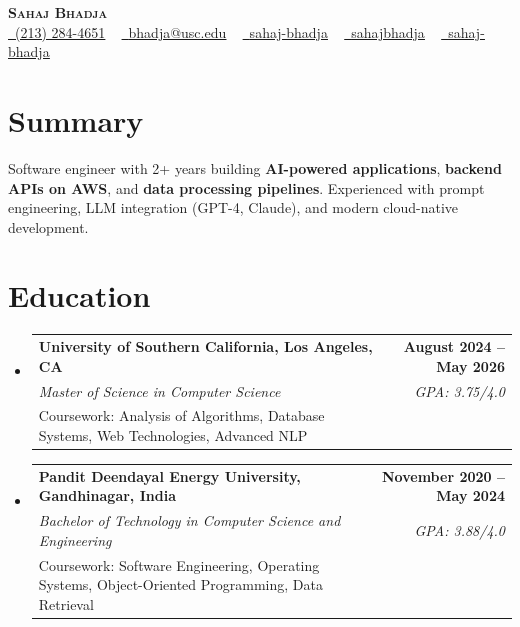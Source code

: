 \documentclass[letterpaper,10pt]{article}
\makeatletter
\newcommand{\resumeEduSubheading}[5]{\vspace{-1pt}\item\begin{tabular*}{1.0\textwidth}[t]{l@{\extracolsep{\fill}}r}\textbf{#1} & \textbf{\small #2} \\\textit{\small #3} & \textit{\small #4} \\\small #5 & \\\end{tabular*}\vspace{-4pt}}
\newcommand{\resumeSubHeadingListStart}{\begin{itemize}[leftmargin=0.0in, label={}]}
\newcommand{\resumeSubHeadingListEnd}{\end{itemize}}
\makeatother
\begin{document}
\begin{center}
{\Huge \scshape \textbf{Sahaj Bhadja}} \\ \vspace{1pt}
\small \href{tel:(213) 284-4651}{\faPhone\ \underline{(213) 284-4651}} ~ \href{mailto:bhadja@usc.edu}{\raisebox{-0.2\height}\faEnvelope\ \underline{bhadja@usc.edu}} ~
\href{https://www.linkedin.com/in/sahaj-bhadja/}{\raisebox{-0.2\height}\faLinkedin\ \underline{sahaj-bhadja}} ~ \href{https://github.com/SAHAJ-BHADJA}{\raisebox{-0.2\height}\faGithub\ \underline{sahajbhadja}} ~
\href{https://sahaj-bhadja.vercel.app/}{\raisebox{-0.2\height}\faGlobe\ \underline{sahaj-bhadja}}
\end{center}
\vspace{-18pt}
\section{Summary}
\begin{itemize}[leftmargin=0.15in, label={}]
\small{\item{Software engineer with 2+ years building \textbf{AI-powered applications}, \textbf{backend APIs on AWS}, and \textbf{data processing pipelines}. Experienced with prompt engineering, LLM integration (GPT-4, Claude), and modern cloud-native development.}}
\end{itemize}
\vspace{-16pt}
\section{Education}
\resumeSubHeadingListStart
\resumeEduSubheading{University of Southern California, Los Angeles, CA}{August 2024 -- May 2026}{Master of Science in Computer Science}{GPA: 3.75/4.0}{Coursework: Analysis of Algorithms, Database Systems, Web Technologies, Advanced NLP}
\vspace{-9pt}
\resumeEduSubheading{Pandit Deendayal Energy University, Gandhinagar, India}{November 2020 -- May 2024}{Bachelor of Technology in Computer Science and Engineering}{GPA: 3.88/4.0}{Coursework: Software Engineering, Operating Systems, Object-Oriented Programming, Data Retrieval}
\resumeSubHeadingListEnd
\vspace{-14pt}
\end{document}
